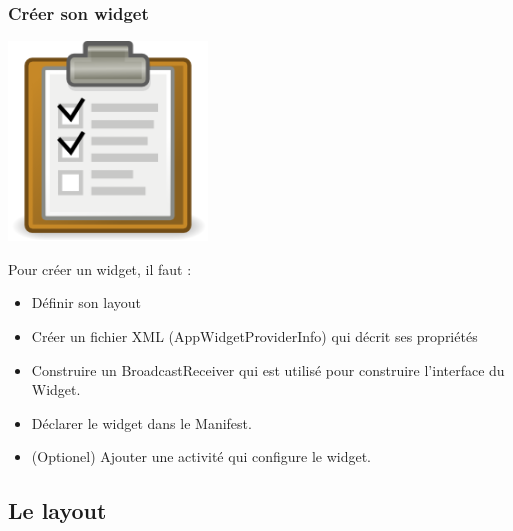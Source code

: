 \documentclass{beamer}
\begin{document}
\begin{frame}
\frametitle{Créer son widget}
\begin{center}
\includegraphics[scale=0.25]{todolist.png}
\end{center}
\begin{block}{Pour créer un widget, il faut :}
\begin{itemize}
\item Définir son layout
\item Créer un fichier XML (AppWidgetProviderInfo) qui décrit ses propriétés
\item Construire un BroadcastReceiver qui est utilisé pour construire l'interface du Widget.
\item Déclarer le widget dans le Manifest.
\item (Optionel) Ajouter une activité qui configure le widget.
\end{itemize}
\end{block}

\end{frame}

\subsection{Le layout}
\end{document}
